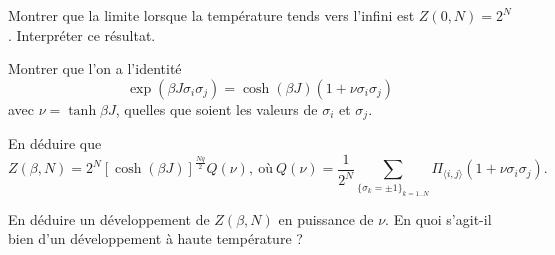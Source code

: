 \question Montrer que la limite lorsque la température tends vers l'infini est  $Z(0,N)=2^N$. Interpréter ce résultat.

\question Montrer que l'on a l'identité
$$
\exp( \beta J \sigma_i \sigma_j )= \cosh(\beta J) (1+ \nu\sigma_i \sigma_j)
$$
avec $\nu=\tanh{\beta J }$, quelles que soient les valeurs de  $\sigma_i$ et $\sigma_j$.

\question En déduire que 
$$
Z(\beta,N)=2^N [\cosh (\beta J)]^{\frac{Nq}{2}} Q(\nu),
\ \text{où}  \ 
Q(\nu)=\frac{1}{2^N} \sum_{\{\sigma_k=\pm 1 \}_{k=1..N}}\Pi_{\langle i,j \rangle}(1+\nu \sigma_i \sigma_j).
$$

\question En déduire un développement de $Z(\beta,N)$ en puissance de $\nu$. En quoi s'agit-il bien d'un développement à haute température ?









